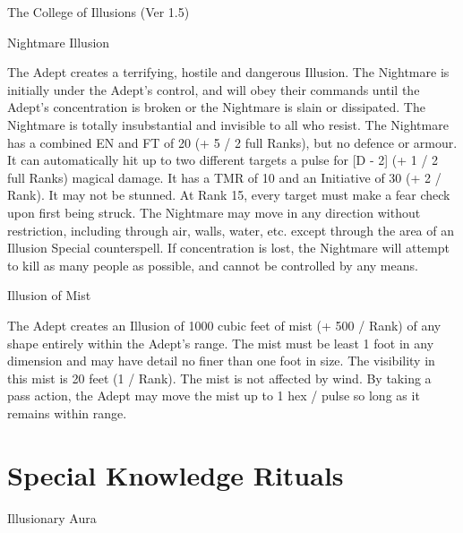 \begin{Chapter}{The College of Illusions (Ver 1.5)}
\begin{spell}[S-14]{Nightmare Illusion}
\begin{effects}
The Adept creates a terrifying, hostile and dangerous Illusion.  The
Nightmare is initially under the Adept’s control, and will obey their
commands until the Adept’s concentration is broken or the Nightmare is
slain or dissipated.  The Nightmare is totally insubstantial and
invisible to all who resist.  The Nightmare has a combined EN and FT
of 20 (+ 5 / 2 full Ranks), but no defence or armour.  It can
automatically hit up to two different targets a pulse for [D - 2] (+ 1
/ 2 full Ranks) magical damage.  It has a TMR of 10 and an Initiative
of 30 (+ 2 / Rank).  It may not be stunned.  At Rank 15, every target
must make a fear check upon first being struck.  The Nightmare may
move in any direction without restriction, including through air,
walls, water, etc.  except through the area of an Illusion Special
counterspell.  If concentration is lost, the Nightmare will attempt to
kill as many people as possible, and cannot be controlled by any
means.
\end{effects}
\end{spell}

\begin{spell}[S-12]{Illusion of Mist}

\begin{effects}
The Adept creates an Illusion of 1000 cubic feet of mist (+ 500 /
Rank) of any shape entirely within the Adept’s range. The mist must be
least 1 foot in any dimension and may have detail no finer than one
foot in size. The visibility in this mist is 20 feet (1 / Rank). The
mist is not affected by wind.  By taking a pass action, the Adept may
move the mist up to 1 hex / pulse so long as it remains within range.
\end{effects}
\end{spell}


\section{Special Knowledge Rituals}

\begin{ritual}[R-1]{Illusionary Aura}


\end{ritual}
\end{Chapter}
